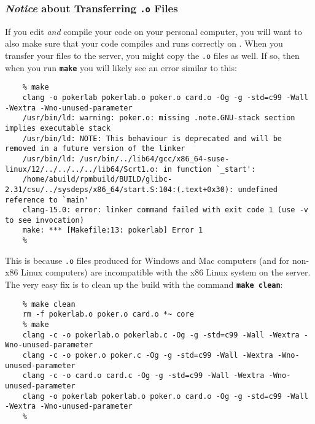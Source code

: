 \subsubsection*{\textit{Notice} about Transferring \texttt{.o} Files}

If you edit \textit{and} compile your code on your personal computer, you will want to also  make sure that your code compiles and runs correctly on \runtimeenvironment.
When you transfer your files to the server, you might copy the \texttt{.o} files as well.
If so, then when you run \texttt{\textbf{make}} you will likely see an error similar to this:
\begin{verbatim}
    % make
    clang -o pokerlab pokerlab.o poker.o card.o -Og -g -std=c99 -Wall -Wextra -Wno-unused-parameter
    /usr/bin/ld: warning: poker.o: missing .note.GNU-stack section implies executable stack
    /usr/bin/ld: NOTE: This behaviour is deprecated and will be removed in a future version of the linker
    /usr/bin/ld: /usr/bin/../lib64/gcc/x86_64-suse-linux/12/../../../../lib64/Scrt1.o: in function `_start':
    /home/abuild/rpmbuild/BUILD/glibc-2.31/csu/../sysdeps/x86_64/start.S:104:(.text+0x30): undefined reference to `main'
    clang-15.0: error: linker command failed with exit code 1 (use -v to see invocation)
    make: *** [Makefile:13: pokerlab] Error 1
    %
\end{verbatim}

This is because \texttt{.o} files produced for Windows and Mac computers (and for non-x86 Linux computers) are incompatible with the x86 Linux system on the server.
The very easy fix is to clean up the build with the command \texttt{\textbf{make clean}}:
\begin{verbatim}
    % make clean
    rm -f pokerlab.o poker.o card.o *~ core
    % make
    clang -c -o pokerlab.o pokerlab.c -Og -g -std=c99 -Wall -Wextra -Wno-unused-parameter
    clang -c -o poker.o poker.c -Og -g -std=c99 -Wall -Wextra -Wno-unused-parameter
    clang -c -o card.o card.c -Og -g -std=c99 -Wall -Wextra -Wno-unused-parameter
    clang -o pokerlab pokerlab.o poker.o card.o -Og -g -std=c99 -Wall -Wextra -Wno-unused-parameter
    %
\end{verbatim}
